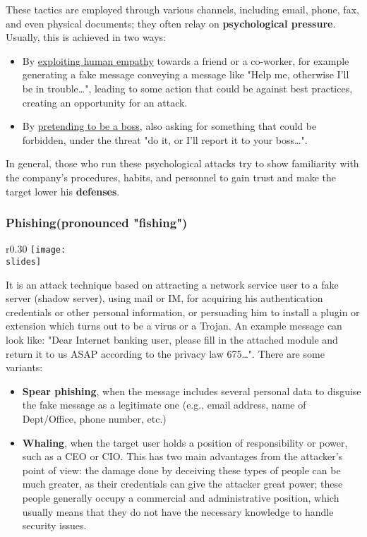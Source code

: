 These tactics are employed through various channels, including email, phone, fax, and even physical documents; they often relay on \textbf{psychological pressure}. Usually, this is achieved in two ways:
\begin{itemize}
  \item By \ul{exploiting human empathy} towards a friend or a co-worker, for example generating a fake message conveying a message like "Help me, otherwise I'll be in trouble…", leading to some action that could be against best practices, creating an opportunity for an attack.
  \item By \ul{pretending to be a boss}, also asking for something that could be forbidden, under the threat "do it, or I'll report it to your boss…".
\end{itemize}

In general, those who run these psychological attacks try to show familiarity with the company's procedures, habits, and personnel to gain trust and make the target lower his \textbf{defenses}.


\subsubsection*{Phishing(pronounced "fishing")}
\begin{wrapfigure}{r}{0.30\textwidth}
  \centering
  \texttt{[image: \\slides]}
\end{wrapfigure}
It is an attack technique based on attracting a network service user to a fake server (shadow server), using mail or IM, for acquiring his authentication credentials or other personal information, or persuading him to install a plugin or extension which turns out to be a virus or a Trojan.
An example message can look like: "Dear Internet banking user, please fill in the attached module and return it to us ASAP according to the privacy law 675…". There are some variants:
\begin{itemize}
  \item \textbf{Spear phishing}, when the message includes several personal data to disguise the fake message as a legitimate one (e.g., email address, name of Dept/Office, phone number, etc.)
  \item \textbf{Whaling}, when the target user holds a position of responsibility or power, such as a CEO or CIO. This has two main advantages from the attacker's point of view: the damage done by deceiving these types of people can be much greater, as their credentials can give the attacker great power; these people generally occupy a commercial and administrative position, which usually means that they do not have the necessary knowledge to handle security issues.
\end{itemize}


